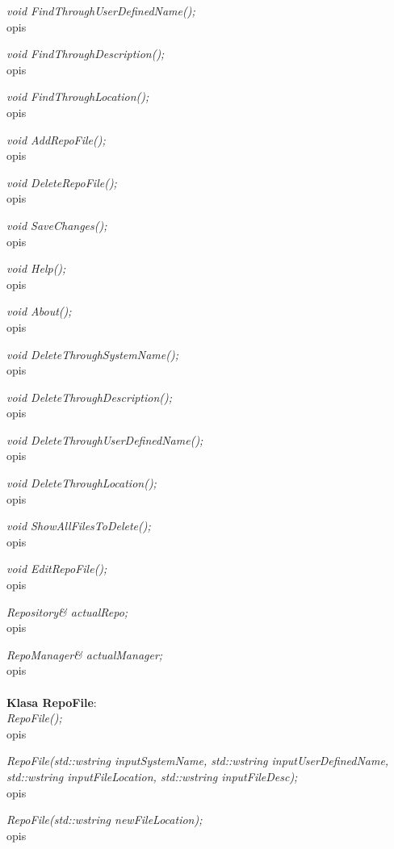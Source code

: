 \documentclass[10pt, a4paper]{article}
\begin{document}
\textit{void FindThroughUserDefinedName();}\\
opis

\textit{void FindThroughDescription();}\\
opis

\textit{void FindThroughLocation();}\\
opis

\textit{void AddRepoFile();}\\
opis

\textit{void DeleteRepoFile();}\\
opis

\textit{void SaveChanges();}\\
opis

\textit{void Help();}\\
opis

\textit{void About();}\\
opis

\textit{void DeleteThroughSystemName();}\\
opis

\textit{void DeleteThroughDescription();}\\
opis

\textit{void DeleteThroughUserDefinedName();}\\
opis

\textit{void DeleteThroughLocation();}\\
opis

\textit{void ShowAllFilesToDelete();}\\
opis

\textit{void EditRepoFile();}\\
opis

\textit{Repository& actualRepo;}\\
opis

\textit{RepoManager& actualManager;}\\
opis
\\\\
\textbf{Klasa RepoFile}:\\

\textit{RepoFile();}\\
opis

\textit{RepoFile(std::wstring inputSystemName, std::wstring inputUserDefinedName, std::wstring inputFileLocation, std::wstring inputFileDesc);}\\
opis

\textit{RepoFile(std::wstring newFileLocation);}\\
opis
\end{document}
